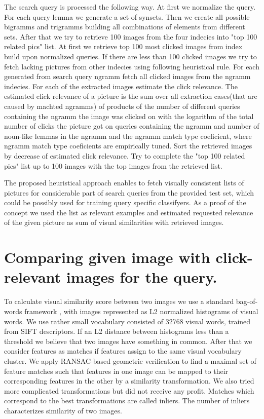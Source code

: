 \documentclass[11pt]{article} %
\begin{document}
The search query is processed the following way. At first we normalize the query. For each query lemma we generate a set of synsets\cite{NLTKSite}. Then we create all possible bigramms and trigramms building all combinations of elements from different sets. After that we try to retrieve 100 images from the four indecies into "top 100 related pics" list. At first we retrieve top 100 most clicked images from index build upon normalized queries. If there are less than 100 clicked images we try to fetch lacking pictures from other indecies using following heuristical rule. For each generated from search query ngramm fetch all clicked images from the ngramm indecies. For each  of the extracted images estimate the click relevance. The estimated click relevance of a picture is the sum over all extraction cases(that are caused by machted ngramms) of products of the number of different queries containing the ngramm the image was clicked on with the logarithm of the total number of clicks the picture got on queries containing the ngramm and number of noun-like lemmas in the ngramm and the ngramm match type coeficient, where ngramm match type coeficients are empirically tuned. Sort the retrieved images by decrease of estimated click relevance. Try  to complete the "top 100 related pics" list up to 100 images with the top images from the retrieved list.

The proposed heuristical approach enables to fetch visually consistent lists of  pictures for considerable part of search queries from the provided test set, which could be possibly used for training query specific classifyers.  As a proof of the concept we used the list as relevant examples and estimated requested relevance of the given picture as sum of visual similarities with retrieved images.

\section{Comparing given image with click-relevant images for the query.}
To calculate visual similarity score between two images we use a standard bag-of-words
framework \cite{Sivic03}, with images represented as L2 normalized histograms of
visual words. We use rather small vocabulary consisted of 32768 visual
words, trained from SIFT\cite{Lowe:2004} descriptors. If an L2 distance between
histograms less than a threshold we believe that two images have
something in common. After that we consider features as matches if
features assign to the same visual vocabulary cluster. We apply
RANSAC-based geometric verification to find a maximal set of feature
matches such that features in one image can be mapped to their
corresponding features in the other by a similarity transformation.
We also tried more complicated transformations but did not receive any
profit. Matches which correspond to the best transformations are
called inliers. The number of inliers characterizes similarity of two images.
\end{document}
